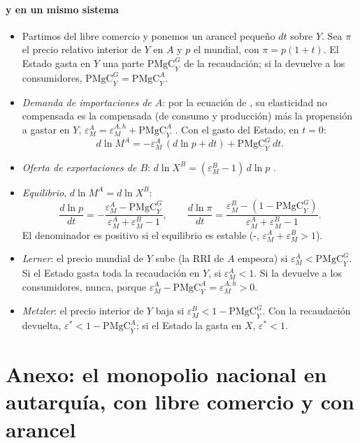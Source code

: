 \documentclass[11pt]{article}
\begin{document}
\paragraph{ y  en un mismo sistema}

\begin{itemize}
\item Partimos del libre comercio y ponemos un arancel pequeño $dt$ sobre $Y$. Sea $\pi$ el precio relativo interior de $Y$ en $A$ y $p$ el mundial, con $\pi=p(1+t)$. El Estado gasta en $Y$ una parte $\mathrm{PMgC}^G_Y$ de la recaudación; si la devuelve a los consumidores, $\mathrm{PMgC}^G_Y=\mathrm{PMgC}^A_Y$.
\item \emph{Demanda de importaciones de $A$}: por la ecuación de , su elasticidad no compensada es la compensada (de consumo y producción) más la propensión a gastar en $Y$, $\varepsilon^A_M=\varepsilon^{A,h}_M+\mathrm{PMgC}^A_Y$ . Con el gasto del Estado, en $t=0$:
  \[
  d\ln M^A=-\varepsilon^A_M\,(d\ln p+dt)+\mathrm{PMgC}^G_Y\,dt.
  \]
\item \emph{Oferta de exportaciones de $B$}: $d\ln X^B=(\varepsilon^B_M-1)\,d\ln p$ .
\item \emph{Equilibrio}, $d\ln M^A=d\ln X^B$:
  \[
  \frac{d\ln p}{dt}=-\frac{\varepsilon^A_M-\mathrm{PMgC}^G_Y}{\varepsilon^A_M+\varepsilon^B_M-1},\qquad
  \frac{d\ln \pi}{dt}=\frac{\varepsilon^B_M-\left(1-\mathrm{PMgC}^G_Y\right)}{\varepsilon^A_M+\varepsilon^B_M-1}.
  \]
  El denominador es positivo si el equilibrio es estable (-, $\varepsilon^A_M+\varepsilon^B_M>1$).
\item \emph{Lerner}: el precio mundial de $Y$ sube (la RRI de $A$ empeora) si $\varepsilon^A_M<\mathrm{PMgC}^G_Y$. Si el Estado gasta toda la recaudación en $Y$, si $\varepsilon^A_M<1$. Si la devuelve a los consumidores, nunca, porque $\varepsilon^A_M-\mathrm{PMgC}^A_Y=\varepsilon^{A,h}_M>0$.
\item \emph{Metzler}: el precio interior de $Y$ baja si $\varepsilon^B_M<1-\mathrm{PMgC}^G_Y$. Con la recaudación devuelta, $\varepsilon^*<1-\mathrm{PMgC}^A_Y$; si el Estado la gasta en $X$, $\varepsilon^*<1$.
\end{itemize}
\findemo

\section{Anexo: el monopolio nacional en autarquía,\cortetitulo{} con libre comercio y con arancel}\label{anexo:monopolio}
\end{document}
